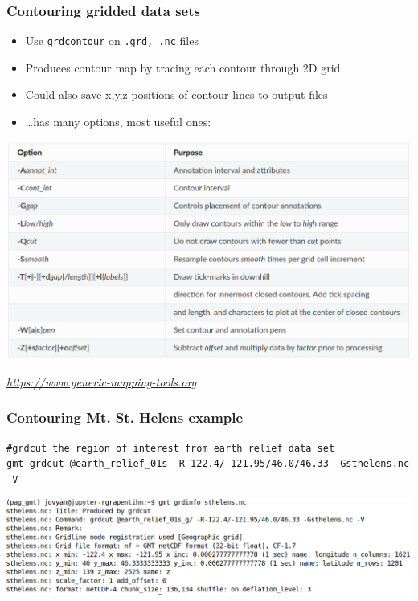 \documentclass[unknownkeysallowed]{beamer}
\begin{document}
\begin{frame}
\frametitle{Contouring gridded data sets}
\begin{itemize}
\item Use {\tt grdcontour} on {\tt .grd, .nc} files
\item Produces contour map by tracing each contour through 2D grid
\item Could also save x,y,z positions of contour lines to output files
\item \dots has many options, most useful ones:
\end{itemize}
	\begin{center}
		\includegraphics[width=.9\textwidth]{../figures/gmt_grdcontour.png}	
	\end{center}
	\vspace{-0.5cm}
	\begin{flushright}
	\tiny{\emph{\url{https://www.generic-mapping-tools.org}}}
	\end{flushright}	
\end{frame}


\begin{frame}[fragile=singleslide]
\frametitle{Contouring Mt. St. Helens example}
{\scriptsize
\begin{verbatim}
#grdcut the region of interest from earth relief data set
gmt grdcut @earth_relief_01s -R-122.4/-121.95/46.0/46.33 -Gsthelens.nc -V
\end{verbatim}
}
\begin{center}
	\includegraphics[width=\textwidth]{../figures/gmt_grdcut_sthelens.png}	
\end{center}
\end{frame}
\end{document}
